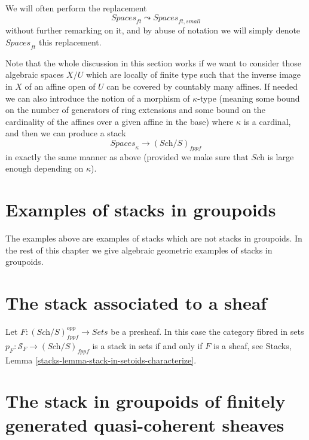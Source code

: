 \noindent
We will often perform the replacement
$$
\textit{Spaces}_{ft} \leadsto \textit{Spaces}_{ft, small}
$$
without further remarking on it, and by abuse of notation we will
simply denote $\textit{Spaces}_{ft}$ this replacement.

\begin{remark}
\label{remark-higher-cardinality-spaces}
Note that the whole discussion in this section works
if we want to consider those algebraic spaces $X/U$ which are
locally of finite type such that the inverse image in $X$ of an affine open
of $U$ can be covered by countably many affines.
If needed we can also introduce the notion of a morphism of
$\kappa$-type (meaning some bound on the number of generators of
ring extensions and some bound on the cardinality of the affines over
a given affine in the base) where $\kappa$ is a cardinal, and then
we can produce a stack
$$
\textit{Spaces}_\kappa \longrightarrow (\textit{Sch}/S)_{fppf}
$$
in exactly the same manner as above (provided we make sure that
$\textit{Sch}$ is large enough depending on $\kappa$).
\end{remark}





\section{Examples of stacks in groupoids}
\label{section-examples-stacks-in-groupoids}

\noindent
The examples above are examples of stacks which are not stacks in
groupoids. In the rest of this chapter we give
algebraic geometric examples of stacks in groupoids.



\section{The stack associated to a sheaf}
\label{section-stack-associated-to-sheaf}

\noindent
Let $F : (\textit{Sch}/S)_{fppf}^{opp} \to \textit{Sets}$ be a presheaf.
In this case the category fibred in sets
$p_F : \mathcal{S}_F \to (\textit{Sch}/S)_{fppf}$
is a stack in sets if and only if $F$ is a sheaf, see
Stacks, Lemma \ref{stacks-lemma-stack-in-setoids-characterize}.



\section{The stack in groupoids of finitely generated quasi-coherent sheaves}
\label{section-stack-in-groupoids-of-quasi-coherent-sheaves}

